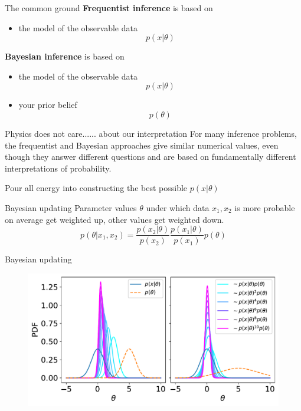 \documentclass[
aspectratio=169,
14pt,
professionalfonts
]{beamer}
\begin{document}
\begin{frame}{The common ground}
\textbf{Frequentist inference} is based on 
\begin{itemize}
    \item the model of the observable data \textbf{$$p(x|\theta)$$}
\end{itemize}
\textbf{Bayesian inference} is based on 
\begin{itemize}
    \item the model of the observable data \textbf{$$p(x|\theta)$$}
    \item your prior belief $$p(\theta)$$
\end{itemize}
\end{frame}

\begin{frame}{Physics does not care...}{... about our interpretation}
For many inference problems, the frequentist and Bayesian approaches give similar numerical
values, even though they answer different questions and are based on fundamentally different interpretations of probability.

Pour all energy into constructing the best possible \textbf{$p(x|\theta)$}
\end{frame}

\begin{frame}{Bayesian updating}
Parameter values $\theta$ under which data $x_1, x_2$ is more probable on average get weighted up, other values get weighted down.
$$
p(\theta | x_1, x_2) = \frac{p(x_2|\theta)}{p(x_2)} \frac{p(x_1|\theta)}{p(x_1)} p(\theta)
$$
\end{frame}

\begin{frame}{Bayesian updating}
\begin{figure}
    \centering
    \includegraphics[width=0.9\linewidth]{../plots/updating.pdf}
\end{figure}
\end{frame}
\end{document}
